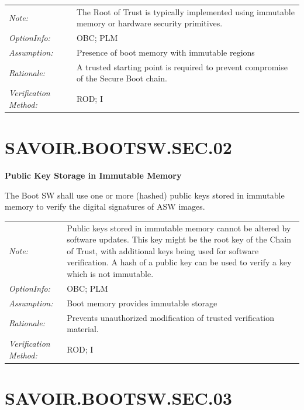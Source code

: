 \vspace{6pt}

\begin{tabularx}{\textwidth}{@{}lX@{}}
\textit{Note:} & The Root of Trust is typically implemented using immutable memory or hardware security primitives. \\[6pt]
\textit{OptionInfo:} & OBC; PLM \\[6pt]
\textit{Assumption:} & Presence of boot memory with immutable regions \\[6pt]
\textit{Rationale:} & A trusted starting point is required to prevent compromise of the Secure Boot chain. \\[6pt]
\textit{Verification Method:} & ROD; I \\[6pt]
\end{tabularx}

\headrule

\section*{SAVOIR.BOOTSW.SEC.02}

\textbf{Public Key Storage in Immutable Memory}

The Boot SW shall use one or more (hashed) public keys stored in immutable memory to verify the digital signatures of ASW images.

\vspace{6pt}

\begin{tabularx}{\textwidth}{@{}lX@{}}
\textit{Note:} & Public keys stored in immutable memory cannot be altered by software updates. This key might be the root key of the Chain of Trust, with additional keys being used for software verification. A hash of a public key can be used to verify a key which is not immutable. \\[6pt]
\textit{OptionInfo:} & OBC; PLM \\[6pt]
\textit{Assumption:} & Boot memory provides immutable storage \\[6pt]
\textit{Rationale:} & Prevents unauthorized modification of trusted verification material. \\[6pt]
\textit{Verification Method:} & ROD; I \\[6pt]
\end{tabularx}

\headrule

\section*{SAVOIR.BOOTSW.SEC.03}

